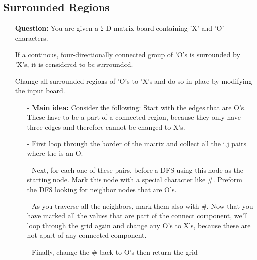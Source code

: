 \documentclass[12pt]{article}
\begin{document}
\subsection{Surrounded Regions}
\begin{enumerate}
  \item[] \textbf{Question:} You are given a 2-D matrix board containing 'X' and 'O' characters.

If a continous, four-directionally connected group of 'O's is surrounded by 'X's, it is considered to be surrounded.

Change all surrounded regions of 'O's to 'X's and do so in-place by modifying the input board.

    \begin{enumerate}
      \item[-] \textbf{Main idea:} Consider the following: Start with the edges that are O's. These have to be a part of a connected region, because they only have three edges and therefore cannot be changed to X's. 
      \item[-] First loop through the border of the matrix and collect all the i,j pairs where the is an O. 
      \item[-] Next, for each one of these pairs, before a DFS using this node as the starting node. Mark this node with a special character like \#. Preform the DFS looking for neighbor nodes that are O's.
      \item[-] As you traverse all the neighbors, mark them also with \#. Now that you have marked all the values that are part of the connect component, we'll loop through the grid again and change any O's to X's, because these are not apart of any connected component. 
      \item[-] Finally, change the \# back to O's then return the grid
    \end{enumerate}
\end{enumerate}
\end{document}
